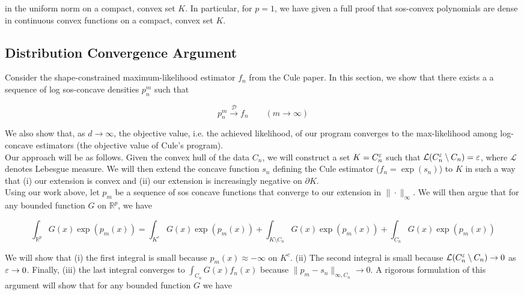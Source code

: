 \documentclass[11pt,reqno]{amsart}
\numberwithin{equation}{section}
\newcommand{\mr}{\mathbb{R}}
\newcommand{\mc}{\mathcal}
\newcommand{\pa}{\partial}
\begin{document}
in the uniform norm on a compact, convex set $K$. In particular, for $p = 1$, we have given a full proof that sos-convex polynomials are dense in continuous convex functions on a compact, convex set $K$. \\

\subsection{Distribution Convergence Argument} Consider the shape-constrained maximum-likelihood estimator $f_n$ from the Cule paper. In this section, we show that there exists a a sequence of log sos-concave densities $p_n^m $ such that 

\begin{equation} \label{distr-conv}
p_n^m \overset{\mathcal{D}}{\longrightarrow} f_n \qquad (m \to \infty) 
\end{equation}

We also show that, as $d \to \infty$, the objective value, i.e. the achieved likelihood, of our program converges to the max-likelihood among log-concave estimators (the objective value of Cule's program). \\

Our approach will be as follows. Given the convex hull of the data $C_n$, we will construct a set $K = C_n^{\varepsilon}$ such that $\mc{L}(C_n^{\eps} \setminus C_n) = \eps$, where $\mc{L}$ denotes Lebesgue measure. We will then extend the concave function $s_n$ defining the Cule estimator ($f_n = \exp(s_n)$) to $K$ in such a way that (i) our extension is convex and (ii) our extension is increasingly negative on $\pa K$. \\

Using our work above, let $p_m$ be a sequence of sos concave functions that converge to our extension in $\| \cdot \|_{\infty}$. We will then argue that for any bounded function $G$ on $\mr^p$, we have 

\[
\int_{\mr^p} G(x) \exp(p_m(x)) = \int_{K^c} G(x) \exp(p_m(x)) + \int_{K \setminus C_n} G(x) \exp(p_m(x)) + \int_{C_n} G(x) \exp(p_m(x))
\]

We will show that (i) the first integral is small because $p_m(x) \approx - \infty$ on $K^c$.  (ii) The second integral is small because $\mc{L}(C_n^{\eps} \setminus C_n) \to 0$ as $\varepsilon \rightarrow 0$. Finally, (iii) the last integral converges to $\int_{C_n} G(x) f_n(x)$ because $\|p_m - s_n\|_{\infty,C_n} \to 0$. A rigorous formulation of this argument will show that for any bounded function $G$ we have 
\end{document}
